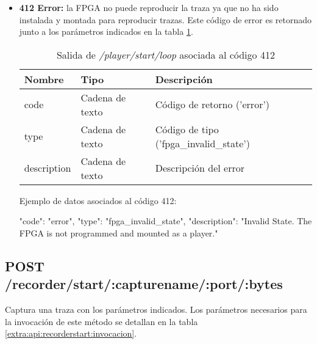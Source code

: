 \begin{itemize}
{\begin{minipage}{\textwidth}
Ejemplo de datos asociados al código 400:

\begin{code}[language=json]
{
  "code": "error",
  "type": "notification",
  "description": "Invalid parameters. The FPGA could not start playing a capture."
}
\end{code}
\end{minipage}
}

\item{\textbf{412 Error:} la \gls{FPGA} no puede reproducir la \gls{traza} ya que no ha sido instalada y montada para reproducir \glspl{traza}. Este código de error es retornado junto a los parámetros indicados en la tabla \ref{extra:api:playerstartloop:error412}.
\begin{table}[H]
\centering
\begin{tabular}{|l|l|l|}
\hline
\rowcolor[HTML]{F5F5F5}
\textbf{Nombre}  & \textbf{Tipo}   & \textbf{Descripción}                    \\ \hline
code             & Cadena de texto & Código de retorno ('error')             \\ \hline
type             & Cadena de texto & Código de tipo ('fpga\_invalid\_state') \\ \hline
description      & Cadena de texto & Descripción del error                   \\ \hline
\end{tabular}
\caption{Salida de \textit{/player/start/loop} asociada al código 412}
\label{extra:api:playerstartloop:error412}
\end{table}

\begin{minipage}{\textwidth}
Ejemplo de datos asociados al código 412:

\begin{code}[language=json]
{
  "code": "error",
  "type": "fpga_invalid_state",
  "description": "Invalid State. The FPGA is not programmed and mounted as a player."
}
\end{code}
\end{minipage}
}

\end{itemize}

%
%
\subsection{POST /recorder/start/:capturename/:port/:bytes}
Captura una \gls{traza} con los parámetros indicados. Los parámetros necesarios para la invocación de este método se detallan en la tabla \ref{extra:api:recorderstart:invocacion}.

